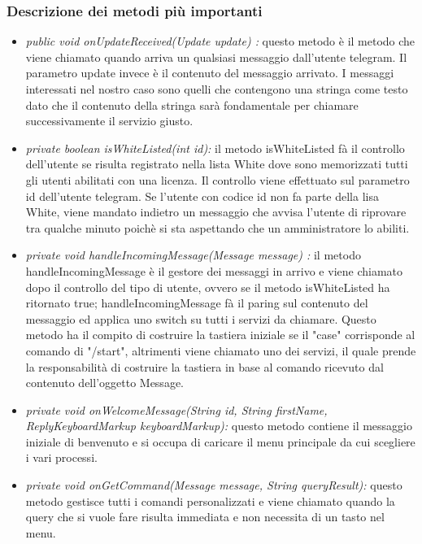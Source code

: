 \subsubsection{Descrizione dei metodi più importanti}


\begin{itemize}
\item \textit{public void onUpdateReceived(Update update) :}  
questo metodo è il metodo che viene chiamato quando arriva un qualsiasi messaggio dall'utente telegram. Il parametro update invece è il contenuto del messaggio arrivato. I messaggi interessati nel nostro caso sono quelli che contengono una stringa come testo dato che il contenuto della stringa sarà fondamentale per chiamare successivamente il servizio giusto.

\item \textit{private boolean isWhiteListed(int id):}
il metodo isWhiteListed fà il controllo dell'utente se risulta registrato nella lista White dove sono memorizzati tutti gli utenti abilitati con una licenza. Il controllo viene effettuato sul parametro id dell'utente telegram. Se l'utente con codice id non fa parte della lisa White, viene mandato indietro un messaggio che avvisa l'utente di riprovare tra qualche minuto poichè si sta aspettando che un amministratore lo abiliti. 

\item \textit{private void handleIncomingMessage(Message message) :}
il metodo handleIncomingMessage è il gestore dei messaggi in arrivo e viene chiamato dopo il controllo del tipo di utente, ovvero se il metodo isWhiteListed ha ritornato true; 
handleIncomingMessage fà il paring sul contenuto del messaggio ed applica uno switch su  tutti i servizi da chiamare. Questo metodo ha il compito di costruire la tastiera iniziale se il "case" corrisponde al comando di "/start", altrimenti viene chiamato uno dei servizi, il quale prende la responsabilità di costruire la tastiera in base al comando ricevuto dal contenuto dell'oggetto Message.

	 \item \textit{private void onWelcomeMessage(String id, String firstName, ReplyKeyboardMarkup keyboardMarkup):} questo metodo contiene il messaggio iniziale di benvenuto e si occupa di caricare il menu principale da cui scegliere i vari processi. 

 \item \textit{private void onGetCommand(Message message, String queryResult):}
questo metodo gestisce tutti i comandi personalizzati e viene chiamato quando la query che si vuole fare risulta immediata e non necessita di un tasto nel menu.


\end{itemize}

